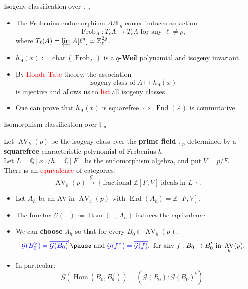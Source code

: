 \documentclass[usenames,dvipsnames]{beamer}
\def\Q{\mathbb{Q}}
\def\Z{\mathbb{Z}}
\def\F{\mathbb{F}}
\DeclareMathOperator{\AV}{AV}
\DeclareMathOperator{\Char}{char}
\DeclareMathOperator{\Frob}{Frob}
\DeclareMathOperator{\Hom}{Hom}
\DeclareMathOperator{\End}{End}
\newcommand{\cG}{\mathcal{G}}
\newcommand{\set}[1]{\left\lbrace#1\right\rbrace }
\newcommand{\red}[1]{\textcolor{red}{#1}}
\newcommand{\blue}[1]{\textcolor{blue}{#1}}
\begin{document}
\begin{frame}{ Isogeny classification over $\F_q$}
	\begin{itemize}
    \item The {Frobenius endomorphism} $A/\F_{q}$ comes 
    \pause induces an action
		\[ \Frob_A : T_\ell A \rightarrow T_\ell A \text{ for any }\ell\neq p, \]
		where $T_\ell(A) = \varprojlim A[\ell^n] \simeq \Z_\ell^{2g}$.
	\pause \item ${h_A(x)}:=\Char(\Frob_A)$ is a {\bf $q$-Weil} polynomial and isogeny {invariant}.
	\pause \item By \red{Honda-Tate} theory, the association
		\[ \text{isogeny class of }A \longmapsto h_A(x) \]
		is injective and allows us to \red{list} all isogeny classes.
	\pause \item One can prove that $h_A(x)$ is squarefree $\iff$ $\End(A)$ is commutative.
	\end{itemize}
\end{frame}

\begin{frame}{ Isomorphism classification over $\F_p$ }
\pause 
    \begin{theorem}
    Let $\AV_h(p)$ be the isogeny class over the {\bf prime field} $\F_p$ determined by a {\bf squarefree} characteristic polynomial of Frobenius $h$.\\
    Let $L=\Q[x]/h=\Q[F]$ be the endomorphism algebra, and put $V=p/F$.\\
\pause 
    There is an \red{equivalence} of categories:
    \[ \AV_h(p) \overset{\cG}{\longrightarrow} \set{\text{fractional $\Z[F,V]$-ideals in $L$}}.  \]
    \end{theorem}
	\begin{itemize}
\pause 
    \item Let $A_h$ be an AV in $\AV_h(p)$ with $\End(A_h)=\Z[F,V]$.
\pause 
    \item The functor $\cG(-):=\Hom(-,A_h)$ induces the equivalence.
\pause 
    \item We can {\bf choose} $A_h$ so that for every $B_0\in \AV_h(p)$:
    \[ \blue{\cG(B_0^\vee) = \overline{\cG(B_0)}^t}
\pause    
     \text{ and } \blue{\cG(f^\vee) = \overline{\cG(f)}}, \text{ for any }f: B_0\to B_0' \text{ in }\AV_h(p). \]
\pause
    \vspace{-0.8cm}     
    \item In particular:
    \vspace{-0.5cm}    
    \[ \cG(\Hom(B_0,B_0^\vee)) = (\cG(B_0):\overline{\cG(B_0)}^t). \]
	\end{itemize}
\end{frame}
\end{document}
